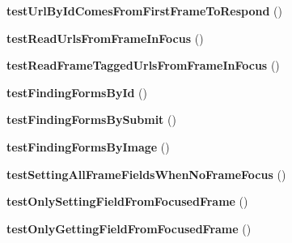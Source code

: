 \begin{DoxyCompactItemize}
\item 
\hypertarget{class_test_of_frameset_page_interface_a03c6314990c8ccaf6403dae68e4f6b96}{
{\bfseries testUrlByIdComesFromFirstFrameToRespond} ()}
\label{class_test_of_frameset_page_interface_a03c6314990c8ccaf6403dae68e4f6b96}

\item 
\hypertarget{class_test_of_frameset_page_interface_a5996f71d11a6f66a43e71770b986487a}{
{\bfseries testReadUrlsFromFrameInFocus} ()}
\label{class_test_of_frameset_page_interface_a5996f71d11a6f66a43e71770b986487a}

\item 
\hypertarget{class_test_of_frameset_page_interface_a6ec20efe424969210af56a485d0a205e}{
{\bfseries testReadFrameTaggedUrlsFromFrameInFocus} ()}
\label{class_test_of_frameset_page_interface_a6ec20efe424969210af56a485d0a205e}

\item 
\hypertarget{class_test_of_frameset_page_interface_a4e6471e47c43f34df490844b66c8e4a3}{
{\bfseries testFindingFormsById} ()}
\label{class_test_of_frameset_page_interface_a4e6471e47c43f34df490844b66c8e4a3}

\item 
\hypertarget{class_test_of_frameset_page_interface_a1d1195991e59aa33cadabe18724b4b95}{
{\bfseries testFindingFormsBySubmit} ()}
\label{class_test_of_frameset_page_interface_a1d1195991e59aa33cadabe18724b4b95}

\item 
\hypertarget{class_test_of_frameset_page_interface_a763d9226741b1b0efad417b63d44384b}{
{\bfseries testFindingFormsByImage} ()}
\label{class_test_of_frameset_page_interface_a763d9226741b1b0efad417b63d44384b}

\item 
\hypertarget{class_test_of_frameset_page_interface_a598c5163fa4562892e296fd25713d7f0}{
{\bfseries testSettingAllFrameFieldsWhenNoFrameFocus} ()}
\label{class_test_of_frameset_page_interface_a598c5163fa4562892e296fd25713d7f0}

\item 
\hypertarget{class_test_of_frameset_page_interface_a2b2448b9592872f9e1a258eb09bdf492}{
{\bfseries testOnlySettingFieldFromFocusedFrame} ()}
\label{class_test_of_frameset_page_interface_a2b2448b9592872f9e1a258eb09bdf492}

\item 
\hypertarget{class_test_of_frameset_page_interface_aac9ebab7640d6d7ccd4d4ad570222ef2}{
{\bfseries testOnlyGettingFieldFromFocusedFrame} ()}
\label{class_test_of_frameset_page_interface_aac9ebab7640d6d7ccd4d4ad570222ef2}

\end{DoxyCompactItemize}
